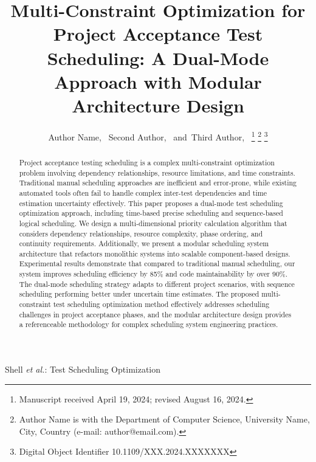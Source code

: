 \documentclass[journal]{IEEEtran}
\begin{document}
\title{Multi-Constraint Optimization for Project Acceptance Test Scheduling: A Dual-Mode Approach with Modular Architecture Design}

\author{Author Name,~
        Second Author,~
        and~Third Author,~
\thanks{Manuscript received April 19, 2024; revised August 16, 2024.}
\thanks{Author Name is with the Department of Computer Science, University Name, City, Country (e-mail: author@email.com).}
\thanks{Digital Object Identifier 10.1109/XXX.2024.XXXXXXX}}

%
{Shell \MakeLowercase{\textit{et al.}}: Test Scheduling Optimization}

\maketitle

\begin{abstract}
Project acceptance testing scheduling is a complex multi-constraint optimization problem involving dependency relationships, resource limitations, and time constraints. Traditional manual scheduling approaches are inefficient and error-prone, while existing automated tools often fail to handle complex inter-test dependencies and time estimation uncertainty effectively. This paper proposes a dual-mode test scheduling optimization approach, including time-based precise scheduling and sequence-based logical scheduling. We design a multi-dimensional priority calculation algorithm that considers dependency relationships, resource complexity, phase ordering, and continuity requirements. Additionally, we present a modular scheduling system architecture that refactors monolithic systems into scalable component-based designs. Experimental results demonstrate that compared to traditional manual scheduling, our system improves scheduling efficiency by 85\% and code maintainability by over 90\%. The dual-mode scheduling strategy adapts to different project scenarios, with sequence scheduling performing better under uncertain time estimates. The proposed multi-constraint test scheduling optimization method effectively addresses scheduling challenges in project acceptance phases, and the modular architecture design provides a referenceable methodology for complex scheduling system engineering practices.
\end{abstract}
\end{document}
